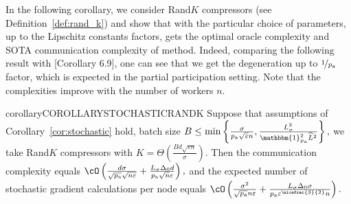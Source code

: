 \documentclass{article}
\newcommand{\algorithmname}{DASHA-PP}
\newcommand*{\probavailable}{\ensuremath{p_{\textnormal{a}}}}
\begin{document}

In the following corollary, we consider Rand$K$ compressors (see Definition~\ref{def:rand_k}) and show that with the particular choice of parameters, up to the Lipschitz constants factors, \algname{\algorithmname-MVR} gets the optimal oracle complexity and SOTA communication complexity of  method. Indeed, comparing the following result with \citep{tyurin2022dasha}[Corollary 6.9], one can see that we get the degeneration up to $\nicefrac{1}{\probavailable}$ factor, which is expected in the partial participation setting. Note that the complexities improve with the number of workers $n.$

\begin{restatable}{corollary}{COROLLARYSTOCHASTICRANDK}
  \label{cor:stochastic:randk}
  Suppose that assumptions of Corollary~\ref{cor:stochastic} hold, batch size $B \leq \min\left\{\frac{\sigma}{\probavailable\sqrt{\varepsilon} n}, \frac{L_{\sigma}^2}{\mathbbm{1}_{\probavailable}^2 \widehat{L}^2}\right\},$ we take Rand$K$ compressors with $K = \Theta\left(\frac{B d \sqrt{\varepsilon n}}{\sigma}\right).$ Then
  the communication complexity equals 
  $
      \cO\left(\frac{d \sigma}{\sqrt{\probavailable} \sqrt{n \varepsilon}} + \frac{L_{\sigma} \Delta_0 d}{\probavailable \sqrt{n} \varepsilon}\right),
  $
  and the expected number of stochastic gradient calculations per node equals
  $
      \cO\left(\frac{\sigma^2}{\sqrt{\probavailable} n \varepsilon} + \frac{L_{\sigma} \Delta_0 \sigma}{\probavailable \varepsilon^{\nicefrac{3}{2}} n}\right).
  $
\end{restatable}
\end{document}

